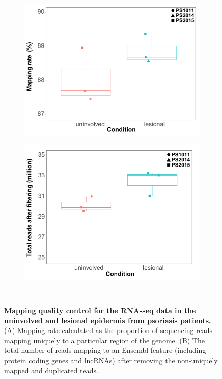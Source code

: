 \begin{figure}[htbp]
\centering
\begin{subfigure}{0.45\textwidth}
\centering
\includegraphics[width=\textwidth]{./Appendix/pdfs/Chapter4/PS_lesional_uninvolved_RNAseq_uniquely_mapped_reads_percent_cell_type_and_batch_boxplots}
\caption{\textbf{}}
\end{subfigure}%
\begin{subfigure}{0.45\textwidth}
\centering
\includegraphics[width=\textwidth]{./Appendix/pdfs/Chapter4/PS_lesional_uninvolved_RNAseq_total_reads_per_cell_type_and_batch}
\caption{\textbf{}}
\end{subfigure} \\
\caption[Mapping quality control for the RNA-seq data in the uninvolved and lesional epidermis from psoriasis patients.]{\textbf{Mapping quality control for the RNA-seq data in the uninvolved and lesional epidermis from psoriasis patients.} (A) Mapping rate calculated as the proportion of sequencing reads mapping uniquely to a particular region of the genome. (B) The total number of reads mapping to an Ensembl feature (including protein coding genes and lncRNAs) after removing the non-uniquely mapped and duplicated reads. }
\label{figure:RNAseq_PS_uninvolved_lesional_psoriasis_skin_mapping}
\end{figure}


